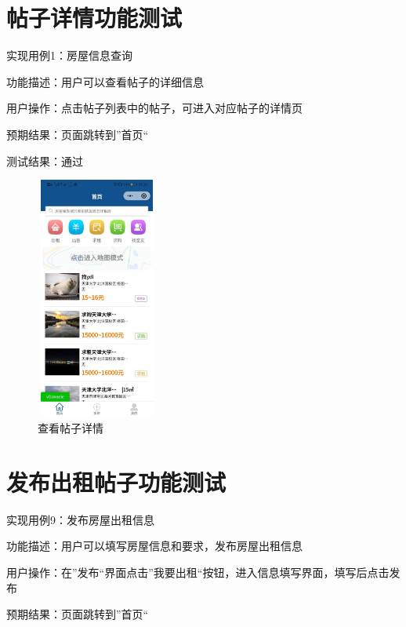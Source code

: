 \section{帖子详情功能测试}
实现用例1：房屋信息查询

功能描述：用户可以查看帖子的详细信息

用户操作：点击帖子列表中的帖子，可进入对应帖子的详情页

预期结果：页面跳转到”首页“

测试结果：通过
\begin{figure}[htbp]
    \centering
    \begin{minipage}[t]{0.48\textwidth}
        \centering
        \includegraphics[width=4cm,height=8cm]{test/image/test16.png} 
       \caption{查看帖子详情} 
        \end{minipage}
   
    \end{figure}
   \newpage 
\section{发布出租帖子功能测试}

实现用例9：发布房屋出租信息

功能描述：用户可以填写房屋信息和要求，发布房屋出租信息

用户操作：在”发布“界面点击”我要出租“按钮，进入信息填写界面，填写后点击发布

预期结果：页面跳转到”首页“

